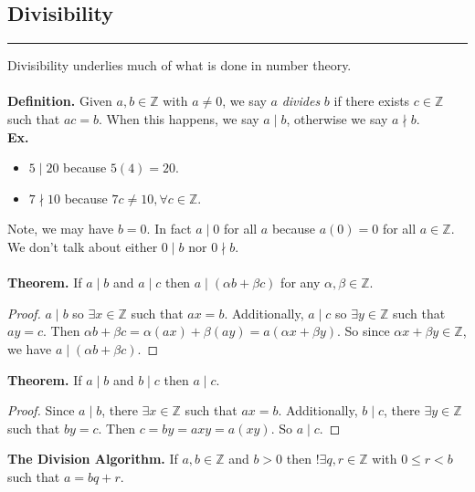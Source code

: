 \documentclass[class=article, crop=false]{standalone}
\def\integers{{\mathbb Z}}
\begin{document}
\subsection{Divisibility}
\rule{\textwidth}{1pt}
Divisibility underlies much of what is done in number theory.\\\\
\textbf{Definition.} Given $a,b\in\integers$ with $a\neq 0$, we say $a$ \emph{divides} $b$ if there exists $c\in\integers$
such that $ac=b$. When this happens, we say $a\mid b$, otherwise we say $a\nmid b$.\\
\textbf{Ex.}
\begin{itemize}
	\item $5\mid 20$ because $5(4) =20$.
	\item $7\nmid 10$ because $7c\neq 10, \forall c\in\integers$.
\end{itemize}
Note, we may have $b=0$. In fact $a\mid 0$ for all $a$ because $a(0)=0$ for all $a\in\integers$. We don't talk about
either $0\mid b$ nor $0\nmid b$.\\\\
\textbf{Theorem.} If $a\mid b$ and $a\mid c$ then $a\mid (\alpha b + \beta c)$ for any $\alpha, \beta\in\integers$.
\begin{proof}
	$a\mid b$ so $\exists x\in\integers$ such that $ax=b$. Additionally, $a\mid c$ so $\exists y\in\integers$ such that
	$ay=c$. Then $\alpha b + \beta c = \alpha(ax) + \beta(ay) = a(\alpha x + \beta y)$. So since $\alpha x + \beta y \in \integers$,
	we have $a\mid (\alpha b + \beta c)$.
\end{proof}
\noindent\textbf{Theorem.} If $a\mid b$ and $b\mid c$ then $a\mid c$.
\begin{proof}
	Since $a\mid b$, there $\exists x\in\integers$ such that $ax=b$. Additionally, $b\mid c$, there $\exists y\in\integers$
	such that $by=c$. Then $c=by=axy=a(xy)$. So $a\mid c$.
\end{proof}
\noindent\textbf{The Division Algorithm.} If $a,b\in\integers$ and $b>0$ then $!\exists q,r\in\integers$ with $0\leq r<b$
such that $a=bq+r$.
\end{document}
